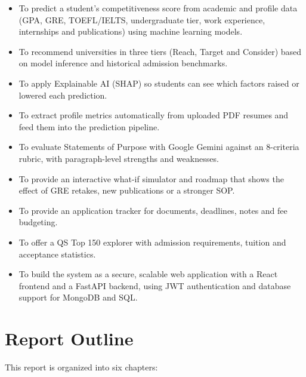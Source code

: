 \begin{itemize}
    \item To predict a student's competitiveness score from academic and profile data (GPA, GRE, TOEFL/IELTS, undergraduate tier, work experience, internships and publications) using machine learning models.
    \item To recommend universities in three tiers (Reach, Target and Consider) based on model inference and historical admission benchmarks.
    \item To apply Explainable AI (SHAP) so students can see which factors raised or lowered each prediction.
    \item To extract profile metrics automatically from uploaded PDF resumes and feed them into the prediction pipeline.
    \item To evaluate Statements of Purpose with Google Gemini against an 8-criteria \cite{mit_sop,cmu_admissions,cmu_sop_guidelines,mit_faculty_essay}rubric, with paragraph-level strengths and weaknesses.
    \item To provide an interactive what-if simulator and roadmap that shows the effect of GRE retakes, new publications or a stronger SOP.
    \item To provide an application tracker for documents, deadlines, notes and fee budgeting.
    \item To offer a QS Top 150 explorer with admission requirements, tuition and acceptance statistics.
    \item To build the system as a secure, scalable web application with a React frontend and a FastAPI backend, using JWT authentication and database support for MongoDB and SQL.
\end{itemize}





\section{Report Outline}


This report is organized into six chapters:

